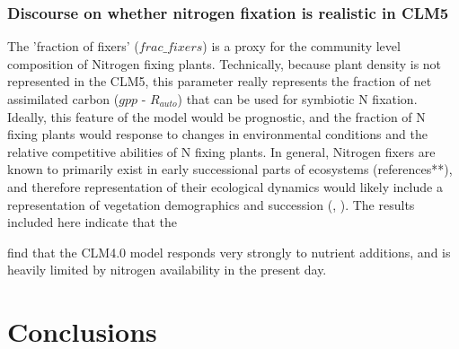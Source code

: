 \documentclass[draft,linenumbers]{agujournal}
\begin{document}
\subsubsection{Discourse on whether nitrogen fixation is realistic in CLM5}
The 'fraction of fixers' ($frac\_fixers$) is a proxy for the community level composition of Nitrogen fixing plants. Technically, because plant density is not represented in the CLM5, this parameter really represents the fraction of net assimilated carbon ($gpp$ - $R_{auto}$) that can be used for symbiotic N fixation. Ideally, this feature of the model would be prognostic, and the fraction of N fixing plants would response to changes in environmental conditions and the relative competitive abilities of N fixing plants. In general, Nitrogen fixers are known to primarily exist in early successional parts of ecosystems (references**), and therefore representation of their ecological dynamics would likely include a representation of vegetation demographics and succession (\cite{fisher2018vegetation}, \cite{trugman2016climate}).  The results included here indicate that the 


 \cite{thomas2013global} find that the CLM4.0 model responds very strongly to nutrient additions, and is heavily limited by nitrogen availability in the present day.


\section{Conclusions}
\end{document}
